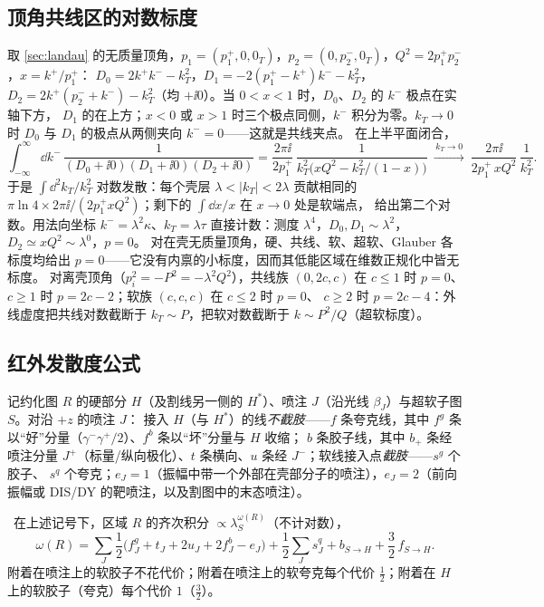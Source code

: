 \subsection{顶角共线区的对数标度}

取 \cref{sec:landau} 的无质量顶角，$p_1=(p_1^+,0,0_T)$，$p_2=(0,p_2^-,0_T)$，$Q^2=2p_1^+p_2^-$，$x=k^+/p_1^+$：
$D_0=2k^+k^--k_T^2$，$D_1=-2(p_1^+-k^+)k^--k_T^2$，$D_2=2k^+(p_2^-+k^-)-k_T^2$（均 $+\ii0$）。当 $0<x<1$ 时，$D_0$、$D_2$ 的 $k^-$ 极点在实轴下方，
$D_1$ 的在上方；$x<0$ 或 $x>1$ 时三个极点同侧，$k^-$ 积分为零。$k_T\to0$ 时 $D_0$ 与 $D_1$ 的极点从两侧夹向 $k^-=0$——这就是共线夹点。
在上半平面闭合，
\begin{equation}\label{eq:pc-kminus}
\int_{-\infty}^{\infty}\!\dd k^-\,\frac{1}{(D_0+\ii0)(D_1+\ii0)(D_2+\ii0)}
=\frac{2\pi\ii}{2p_1^+}\,\frac{1}{k_T^2\big(xQ^2-k_T^2/(1-x)\big)}\ \xrightarrow{\,k_T\to0\,}\ \frac{2\pi\ii}{2p_1^+\,xQ^2}\,\frac{1}{k_T^2}.
\end{equation}
于是 $\int\dd^2k_T/k_T^2$ 对数发散：每个壳层 $\lambda<|k_T|<2\lambda$ 贡献相同的 $\pi\ln4\times2\pi\ii/(2p_1^+xQ^2)$；剩下的 $\int\dd x/x$ 在 $x\to0$ 处是软端点，
给出第二个对数。用法向坐标 $k^-=\lambda^2\kappa$、$k_T=\lambda\tau$ 直接计数：测度 $\lambda^4$，$D_0,D_1\sim\lambda^2$，$D_2\simeq xQ^2\sim\lambda^0$，$p=0$。
对在壳无质量顶角，硬、共线、软、超软、Glauber 各标度均给出 $p=0$——它没有内禀的小标度，因而其低能区域在维数正规化中皆无标度。
对离壳顶角（$p_i^2=-P^2=-\lambda^2Q^2$），共线族 $(0,2c,c)$ 在 $c\le1$ 时 $p=0$、$c\ge1$ 时 $p=2c-2$；软族 $(c,c,c)$ 在 $c\le2$ 时 $p=0$、
$c\ge2$ 时 $p=2c-4$：外线虚度把共线对数截断于 $k_T\sim P$，把软对数截断于 $k\sim P^2/Q$（超软标度）。

\subsection{红外发散度公式}

记约化图 $R$ 的硬部分 $H$（及割线另一侧的 $H^*$）、喷注 $J$（沿光线 $\beta_J$）与超软子图 $S$。对沿 $+z$ 的喷注 $J$：
接入 $H$（与 $H^*$）的线\emph{不截肢}——$f$ 条夸克线，其中 $f^g$ 条以“好”分量（$\gamma^-\gamma^+/2$）、$f^b$ 条以“坏”分量与 $H$ 收缩；
$b$ 条胶子线，其中 $b_+$ 条经喷注分量 $J^+$（标量/纵向极化）、$t$ 条横向、$u$ 条经 $J^-$；软线接入点\emph{截肢}——$s^g$ 个胶子、
$s^q$ 个夸克；$e_J=1$（振幅中带一个外部在壳部分子的喷注），$e_J=2$（前向振幅或 DIS/DY 的靶喷注，以及割图中的末态喷注）。

\begin{proposition}\label{prop:pc-omega}\tagR\
在上述记号下，区域 $R$ 的齐次积分 $\propto\lambda_S^{\omega(R)}$（不计对数），
\begin{equation}\label{eq:pc-omega}
\omega(R)=\sum_J\frac12\Big(f_J^{g}+t_J+2u_J+2f_J^{b}-e_J\Big)+\frac12\sum_Js^{q}_J+b_{S\to H}+\frac32\,f_{S\to H}.
\end{equation}
附着在喷注上的软胶子不花代价；附着在喷注上的软夸克每个代价 $\tfrac12$；附着在 $H$ 上的软胶子（夸克）每个代价 $1$（$\tfrac32$）。
\end{proposition}

